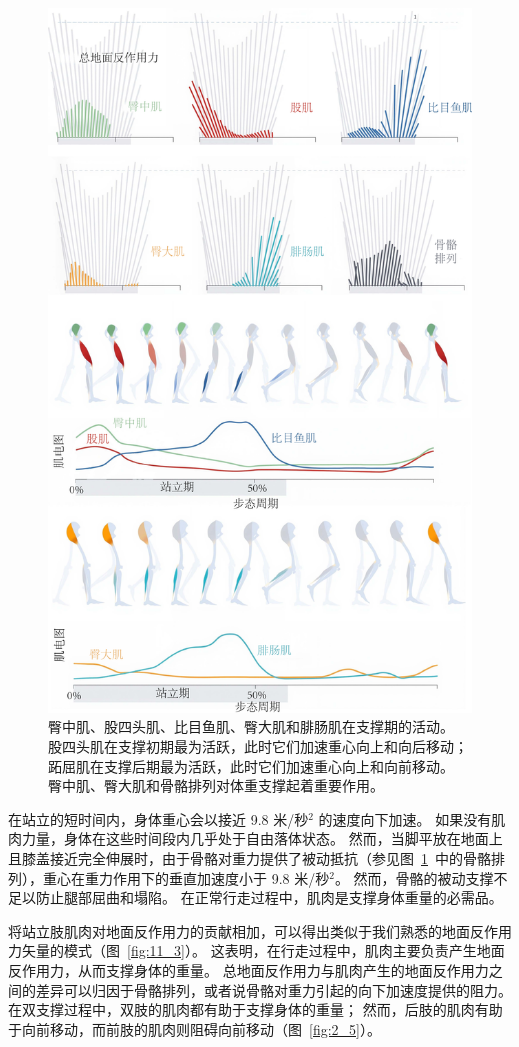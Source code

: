 \begin{figure}[!htb]
	\centering
	\includegraphics[width=0.73\linewidth]{chap11/11_2}
	\caption{臀中肌、股四头肌、比目鱼肌、臀大肌和腓肠肌在支撑期的活动。
		股四头肌在支撑初期最为活跃，此时它们加速重心向上和向后移动；
		跖屈肌在支撑后期最为活跃，此时它们加速重心向上和向前移动。
		臀中肌、臀大肌和骨骼排列对体重支撑起着重要作用\cite{liu2008muscle}。\label{fig:11_2}}
\end{figure}

在站立的短时间内，身体重心会以接近 9.8 米/秒$^2$ 的速度向下加速。
如果没有肌肉力量，身体在这些时间段内几乎处于自由落体状态。
然而，当脚平放在地面上且膝盖接近完全伸展时，由于骨骼对重力提供了被动抵抗（参见图~\ref{fig:11_2}~中的骨骼排列），重心在重力作用下的垂直加速度小于 9.8 米/秒$^2$。
然而，骨骼的被动支撑不足以防止腿部屈曲和塌陷。
在正常行走过程中，肌肉是支撑身体重量的必需品。


将站立肢肌肉对地面反作用力的贡献相加，可以得出类似于我们熟悉的地面反作用力矢量的模式（图~\ref{fig:11_3}）。
这表明，在行走过程中，肌肉主要负责产生地面反作用力，从而支撑身体的重量。
总地面反作用力与肌肉产生的地面反作用力之间的差异可以归因于骨骼排列，或者说骨骼对重力引起的向下加速度提供的阻力。
在双支撑过程中，双肢的肌肉都有助于支撑身体的重量；
然而，后肢的肌肉有助于向前移动，而前肢的肌肉则阻碍向前移动（图~\ref{fig:2_5}）。


